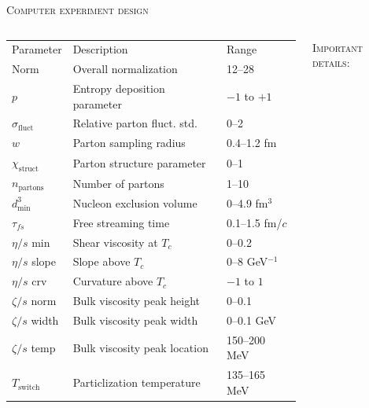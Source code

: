 \documentclass[aspectratio=169]{beamer}
\newcommand{\sigmaf}{\sigma_\text{fluct}}
\newcommand{\X}{\chi_\text{struct}}
\newcommand{\npartons}{n_\text{partons}}
\newcommand{\dmin}{d_\text{min}^3}
\newcommand{\paddedhline}{\noalign{\smallskip}\hline\noalign{\smallskip}}
\begin{document}
\begin{frame}[t]{\scshape Computer experiment design}
  \bigskip
  \begin{columns}[T]
    \begin{column}{.6\textwidth}
      \scriptsize
      \begin{tabular}{lll}
        Parameter         & Description                        & Range           \\
        \paddedhline
        Norm              & Overall normalization              & 12--28          \\
        $p$               & Entropy deposition parameter       & $-1$ to $+1$    \\
        $\sigmaf$         & Relative parton fluct. std.\       & 0--2            \\
        $w$               & Parton sampling radius             & 0.4--1.2 fm     \\
        $\X$              & Parton structure parameter         & 0--1            \\
        $\npartons$       & Number of partons                  & 1--10           \\
        $\dmin$           & Nucleon exclusion volume           & 0--4.9 fm$^3$   \\
        $\tau_{fs}$       & Free streaming time                & 0.1--1.5 fm/$c$ \\
        $\eta/s$ min      & Shear viscosity at $T_c$           & 0--0.2          \\
        $\eta/s$ slope    & Slope above $T_c$                  & 0--8 GeV$^{-1}$ \\
        $\eta/s$ crv      & Curvature above $T_c$              & $-1$ to $1$     \\
        $\zeta/s$ norm    & Bulk viscosity peak height         & 0--0.1          \\
        $\zeta/s$ width   & Bulk viscosity peak width          & 0--0.1 GeV      \\
        $\zeta/s$ temp    & Bulk viscosity peak location       & 150--200 MeV    \\
        $T_\text{switch}$ & Particlization temperature         & 135--165 MeV    \\
      \end{tabular}
    \end{column}
    \begin{column}{.4\textwidth}
      \textcolor{theme}{\scshape Important details:}
      \smallskip
      \begin{itemize}

\end{itemize}
\end{column}
\end{columns}
\end{frame}
\end{document}
